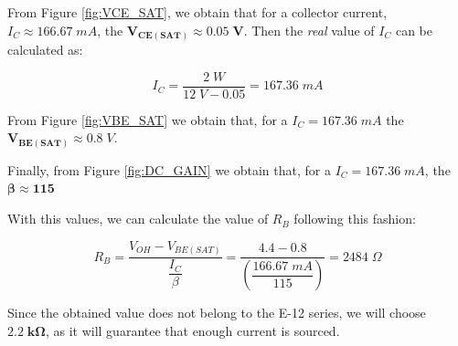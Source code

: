 From Figure \ref{fig:VCE_SAT}, we obtain that for a collector current, $I_C \approx 166.67 \; mA$, the $\bm{V_{CE(SAT)} \approx 0.05 \;V}$. Then the \textit{real} value of $I_C$ can be calculated as:

\begin{equation*}
    I_C = \frac{2 \; W}{12 \; V - 0.05} = 167.36 \; mA
\end{equation*}

\noindent From Figure \ref{fig:VBE_SAT} we obtain that, for a $I_C = 167.36 \; mA$ the $\bm{V_{BE(SAT)}} \approx 0.8 \; V$.\medskip

\noindent Finally, from Figure \ref{fig:DC_GAIN} we obtain that, for a $I_C = 167.36 \; mA$, the $\bm{\beta \approx 115}$ \medskip

\noindent With this values, we can calculate the value of $R_B$ following this fashion:

\begin{equation}
    R_B = \frac{V_{OH} - V_{BE(SAT)}}{\dfrac{I_C}{\beta}} = \frac{4.4 - 0.8}{\left( \dfrac{166.67 \; mA}{115} \right)} = 2484 \; \Omega
\end{equation}\medskip

Since the obtained value does not belong to the E-12 series, we will choose $\bm{2.2 \; k\Omega}$, as it will guarantee that enough current is sourced.

\clearpage


























